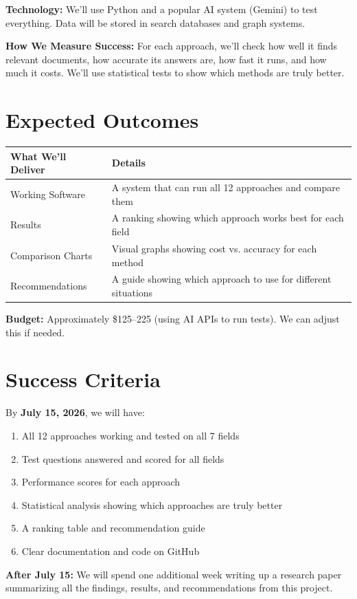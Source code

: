\documentclass[11pt,a4paper]{article}
\begin{document}
\noindent
\textbf{Technology:} We'll use Python and a popular AI system (Gemini) to test everything. Data will be stored in search databases and graph systems.

\noindent
\textbf{How We Measure Success:} For each approach, we'll check how well it finds relevant documents, how accurate its answers are, how fast it runs, and how much it costs. We'll use statistical tests to show which methods are truly better.

\section*{Expected Outcomes}

\begin{table}[h]
\centering
\small
\begin{tabularx}{\textwidth}{l|X}
\toprule
\textbf{What We'll Deliver} & \textbf{Details} \\
\midrule
Working Software & A system that can run all 12 approaches and compare them \\
Results & A ranking showing which approach works best for each field \\
Comparison Charts & Visual graphs showing cost vs. accuracy for each method \\
Recommendations & A guide showing which approach to use for different situations \\
\bottomrule
\end{tabularx}
\end{table}

\vspace{0.2cm}
\noindent
\textbf{Budget:} Approximately \$125--225 (using AI APIs to run tests). We can adjust this if needed.

\section*{Success Criteria}

By \textbf{July 15, 2026}, we will have:
\begin{enumerate}\setlength{\itemsep}{2pt}
    \item All 12 approaches working and tested on all 7 fields
    \item Test questions answered and scored for all fields
    \item Performance scores for each approach
    \item Statistical analysis showing which approaches are truly better
    \item A ranking table and recommendation guide
    \item Clear documentation and code on GitHub
\end{enumerate}

\vspace{0.3cm}
\noindent
\textbf{After July 15:} We will spend one additional week writing up a research paper summarizing all the findings, results, and recommendations from this project.
\end{document}
